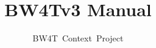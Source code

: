 \documentclass[oneside]{tudelft-report}
\begin{document}
\frontmatter

\title[Blocks World for Teams]{BW4Tv3 Manual}
\author{BW4T~Context~Project}
\makecover



\mainmatter
\setcounter{tocdepth}{1}
\tableofcontents




\end{document}
